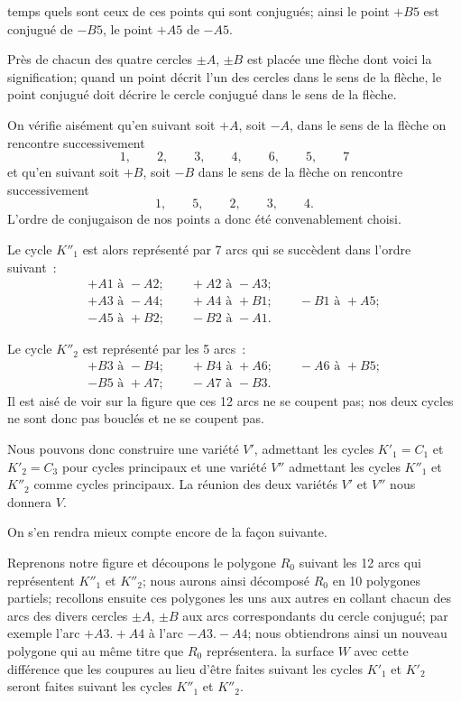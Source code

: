 \documentclass{article}
\begin{document}
temps quels sont ceux de ces points qui sont conjugués; ainsi le point $+B5$ est conjugué de $-B5$, le point $+A5$ de $-A5$.

Près de chacun des quatre cercles $\pm A$, $\pm B$ est placée une flèche dont voici la signification; quand un point décrit l'un des cercles dans le sens de la flèche, le point conjugué doit décrire le cercle conjugué dans le sens de la flèche.

On vérifie aisément qu'en suivant soit $+A$, soit $-A$, dans le sens de la flèche on rencontre successivement
\[ 1, \qquad 2, \qquad 3, \qquad 4, \qquad 6, \qquad 5, \qquad 7 \]
et qu'en suivant soit $+B$, soit $-B$ dans le sens de la flèche on rencontre successivement
\[ 1, \qquad 5, \qquad 2, \qquad 3, \qquad 4. \]
L'ordre de conjugaison de nos points a donc été convenablement choisi.

Le cycle $K''_{1}$ est alors représenté par 7 arcs qui se succèdent dans l'ordre suivant~:
\[ \begin{gathered} +A1 \text{ à } -A2; \qquad +A2 \text{ à } -A3;\\ +A3 \text{ à } -A4; \qquad +A4 \text{ à } +B1; \qquad -B1 \text{ à } +A5;\\ -A5 \text{ à } +B2; \qquad -B2 \text{ à } -A1. \end{gathered} \]

Le cycle $K''_{2}$ est représenté par les 5 arcs~:
\[ \begin{gathered} +B3 \text{ à } -B4; \qquad +B4 \text{ à } +A6; \qquad -A6 \text{ à } +B5;\\ -B5 \text{ à } +A7; \qquad -A7 \text{ à } -B3. \end{gathered} \]
Il est aisé de voir sur la figure que ces 12 arcs ne se coupent pas; nos deux cycles ne sont donc pas bouclés et ne se coupent pas.

Nous pouvons donc construire une variété $V'$, admettant les cycles $K'_{1} = C_{1}$ et $K'_{2} = C_{3}$ pour cycles principaux et une variété $V''$ admettant les cycles $K''_{1}$ et $K''_{2}$ comme cycles principaux. La réunion des deux variétés $V'$ et $V''$ nous donnera $V$.

On s'en rendra mieux compte encore de la façon suivante.

Reprenons notre figure et découpons le polygone $R_{0}$ suivant les 12 arcs qui représentent $K''_{1}$ et $K''_{2}$; nous aurons ainsi décomposé $R_{0}$ en 10 polygones partiels; recollons ensuite ces polygones les uns aux autres en collant chacun des arcs des divers cercles $\pm A$, $\pm B$ aux arcs correspondants du cercle conjugué; par exemple l'arc $+A3. +A4$ à l'arc $-A3. -A4$; nous obtiendrons ainsi un nouveau polygone qui au même titre que $R_{0}$ représentera. la surface $W$ avec cette différence que les coupures au lieu d'être faites suivant les cycles $K'_{1}$ et $K'_{2}$ seront faites suivant les cycles $K''_{1}$ et $K''_{2}$.
\end{document}
